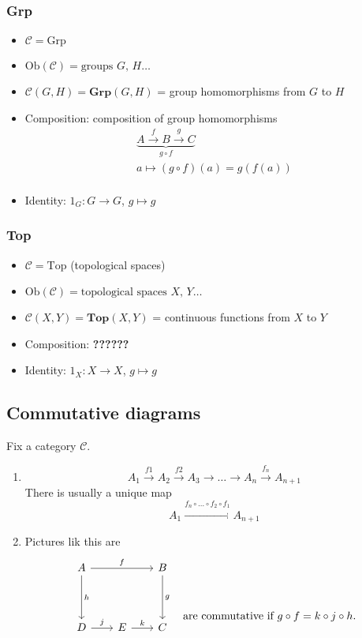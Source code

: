 \documentclass{article}
\newcommand*{\longto}{\xrightarrow{\hspace{10pt}}}
\begin{document}
    \subsubsection{Grp}
    \begin{itemize}
        \item $\mathcal{C} = \text{Grp}$
        \item $\text{Ob}(\mathcal{C}) = \text{groups $G$, $H$} \dots$
        \item $\mathcal{C}(G, H) = \textbf{Grp}(G, H)$ = group homomorphisms from $G$ to $H$
        \item Composition: composition of group homomorphisms
        \begin{gather*}
            \underbrace{A \stackrel{f}{\to} B \stackrel{g}{\to} C}_{g \circ f}\\
            a \mapsto (g \circ f)(a) = g(f(a))\\
        \end{gather*}
        \item Identity: $1_G: G \to G$, $g \mapsto g$
    \end{itemize}

    \subsubsection{Top}
    \begin{itemize}
        \item $\mathcal{C} = \text{Top}$ (topological spaces)
        \item $\text{Ob}(\mathcal{C}) = \text{topological spaces $X$, $Y$} \dots$
        \item $\mathcal{C}(X, Y) = \textbf{Top}(X, Y)$ = continuous functions from $X$ to $Y$
        \item Composition: \textbf{??????}
        \item Identity: $1_X: X \to X$, $g \mapsto g$
    \end{itemize}

    \subsection{Commutative diagrams}
    Fix a category $\mathcal{C}$.
    \begin{enumerate}
        \item\[
                 A_1 \stackrel{f1}{\to} A_2 \stackrel{f2}{\to} A_3 \to \dots \to A_n \stackrel{f_n}{\to} A_{n+1}
        \]
        There is usually a unique map
        \[
            A_1 \stackrel{f_n \circ \dots \circ f_2 \circ f_1}{\longto} A_{n+1}
        \]
        \item Pictures lik this are
        \[
            \begin{tikzcd}[column sep=2em, row sep=4em] %
                A  \arrow[d, "h"] \arrow[rr, "f"] &
                & B \arrow[d, "g"] \\
                D \arrow[r, "j"] & E \arrow[r, "k"] & C \\
            \end{tikzcd}
            \quad \text{are commutative if } g\circ f = k \circ j \circ h.
        \]
    \end{enumerate}
\end{document}
